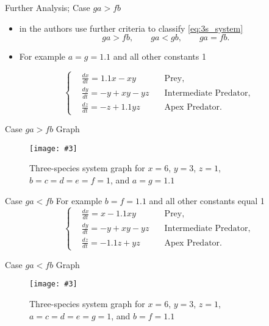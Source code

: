 \documentclass[hyperref={colorlinks,allcolors=black}]{beamer}
\newcommand{\makefig}[4]{
    \begin{figure}[#1]
        \captionsetup{justification=centering}
        \texttt{[image: \#3]}
        \caption{#4}
        \label{fig:#3}
    \end{figure}
}
\begin{document}
\begin{frame}{Further Analysis; Case $ga>fb$}
\begin{itemize}
\setlength\itemsep{1em}
    \item in \cite{chauvet} the authors use further criteria to
        classify \eqref{eq:3s_system}
\begin{equation}\nonumber
    ga > fb, \qquad ga < gb, \qquad  ga = fb.
\end{equation}
\item For example $a=g=1.1$ and all other constants 1
\end{itemize}
\begin{equation}\nonumber
    \left\{\begin{aligned}
        &\frac{dx}{dt} = 1.1x - xy              &\text{Prey,}\\
        &\frac{dy}{dt} = -y + xy - yz \quad &\text{Intermediate Predator,}\\
        &\frac{dz}{dt} = -z + 1.1yz             &\text{Apex Predator.}
    \end{aligned}\right.
\end{equation}
\end{frame}

\begin{frame}{Case $ga>fb$ Graph}
\makefig{h}{0.9\textwidth}{3s_ga_g_fb_graph}{Three-species system graph for $x=6$, $y=3$, $z=1$, $b=c=d=e=f=1$, and $a=g=1.1$}
\end{frame}

\begin{frame}{Case $ga < fb$}
For example $b=f=1.1$ and all other constants equal 1
\begin{equation}\nonumber
    \left\{\begin{aligned}
        &\frac{dx}{dt} = x - 1.1xy              &\text{Prey,}\\
        &\frac{dy}{dt} = -y + xy - yz \quad &\text{Intermediate Predator,}\\
        &\frac{dz}{dt} = -1.1z + yz             &\text{Apex Predator.}
    \end{aligned}\right.
\end{equation}
\end{frame}

\begin{frame}{Case $ga < fb$ Graph}
\makefig{h}{0.9\textwidth}{3s_ga_l_fb_graph}{Three-species system graph for $x=6$, $y=3$, $z=1$, $a=c=d=e=g=1$, and $b=f=1.1$}
\end{frame}
\end{document}
